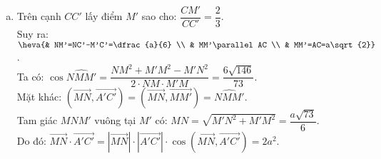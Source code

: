 \begin{ex}
{\begin{enumerate}[a)]
	\item Trên cạnh $CC'$ lấy điểm $M'$ sao cho: $\dfrac{CM'}{CC'}=\dfrac{2}{3}$.\\
	 Suy ra: $\heva{& NM'=NC'-M'C'=\dfrac{a}{6} \\ & MM'\parallel AC \\ & MM'=AC=a\sqrt{2}} $.\\
	 Ta có: $\cos \widehat{NMM'}=\dfrac{NM^2+M'M^2-M'N^2}{2 \cdot NM \cdot M'M}=\dfrac{6\sqrt{146}}{73}$.\\
	 Mặt khác: $\left(\vec{MN},\vec{A'C'}\right)=\left(\vec{MN},\vec{MM'}\right)=\widehat{NMM'}$.\\
	 Tam giác $MNM'$ vuông tại $M'$ có: $MN=\sqrt{M'N^2+M'M^2}=\dfrac{a\sqrt{73}}{6}$.\\
	 Do đó: $\vec{MN}\cdot \vec{A'C'}=\left| \vec{MN} \right| \cdot \left| \vec{A'C'} \right| \cdot \cos \left(\vec{MN},\vec{A'C'}\right)=2a^2$.
	\end{enumerate}
	}
\end{ex}
